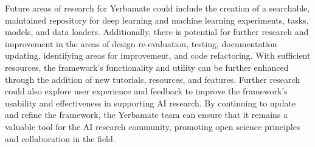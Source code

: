 Future areas of research for Yerbamate could include the creation of a searchable, maintained repository for deep learning and machine learning experiments, tasks, models, and data loaders. Additionally, there is potential for further research and improvement in the areas of design re-evaluation, testing, documentation updating, identifying areas for improvement, and code refactoring. With sufficient resources, the framework's functionality and utility can be further enhanced through the addition of new tutorials, resources, and features. Further research could also explore user experience and feedback to improve the framework's usability and effectiveness in supporting AI research. By continuing to update and refine the framework, the Yerbamate team can ensure that it remains a valuable tool for the AI research community, promoting open science principles and collaboration in the field.


